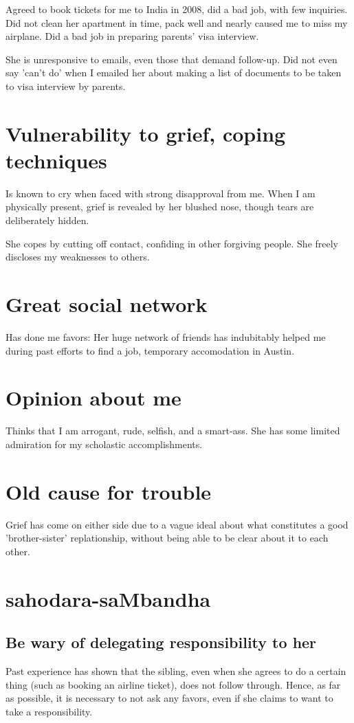 \documentclass[oneside, article]{memoir}
\begin{document}
 \subitem Agreed to book tickets for me to India in 2008, did a bad job, with few inquiries.
 \subitem Did not clean her apartment in time, pack well and nearly caused me to miss my airplane.
 \subitem Did a bad job in preparing parents' visa interview.

She is unresponsive to emails, even those that demand follow-up.
 \subitem Did not even say 'can't do' when I emailed her about making a list of documents to be taken to visa interview by parents.


\section{Vulnerability to grief, coping techniques}
Is known to cry when faced with strong disapproval from me. When I am physically present, grief is revealed by her blushed nose, though tears are deliberately hidden.

She copes by cutting off contact, confiding in other forgiving people. She freely discloses my weaknesses to others.

\section{Great social network}
Has done me favors: Her huge network of friends has indubitably helped me during past efforts to find a job, temporary accomodation in Austin.

\section{Opinion about me}
Thinks that I am arrogant, rude, selfish, and a smart-ass. She has some limited admiration for my scholastic accomplishments.

\section{Old cause for trouble}
Grief has come on either side due to a vague ideal about what constitutes a good 'brother-sister' replationship, without being able to be clear about it to each other.


\section{sahodara-saMbandha}
\subsection{Be wary of delegating responsibility to her}
Past experience has shown that the sibling, even when she agrees to do a certain thing (such as booking an airline ticket), does not follow through. Hence, as far as possible, it is necessary to not ask any favors, even if she claims to want to take a responsibility.
\end{document}
